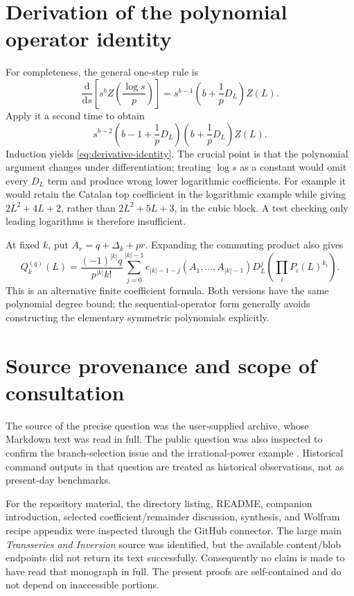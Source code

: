 \documentclass[11pt,a4paper]{article}
\theoremstyle{definition}
\theoremstyle{remark}
\newcommand{\dd}{\mathrm d}
\begin{document}
\section{Derivation of the polynomial operator identity}

For completeness, the general one-step rule is
\[
 \frac{\dd}{\dd s}\left[s^bZ\!\left(\frac{\log s}{p}\right)\right]
 =s^{b-1}\left(b+\frac1pD_L\right)Z(L).
\]
Apply it a second time to obtain
\[
 s^{b-2}\left(b-1+\frac1pD_L\right)
          \left(b+\frac1pD_L\right)Z(L).
\]
Induction yields \eqref{eq:derivative-identity}. The crucial point is that the
polynomial argument changes under differentiation; treating $\log s$ as a
constant would omit every $D_L$ term and produce wrong lower logarithmic
coefficients. For example it would retain the Catalan top coefficient in the
logarithmic example while giving $2L^2+4L+2$, rather than
$2L^2+5L+3$, in the cubic block. A test checking
only leading logarithms is therefore insufficient.

At fixed $k$, put $A_r=q+\Delta_k+pr$. Expanding the commuting product also
gives
\[
 Q_k^{(q)}(L)=\frac{(-1)^{|k|}q}{p^{|k|}k!}
 \sum_{j=0}^{|k|-1}e_{|k|-1-j}(A_1,\ldots,A_{|k|-1})
 D_L^j\!\left(\prod_iP_i(L)^{k_i}\right).
\]
This is an alternative finite coefficient formula. Both versions have the
same polynomial degree bound; the sequential-operator form generally avoids
constructing the elementary symmetric polynomials explicitly.

\section{Source provenance and scope of consultation}

The source of the precise question was the user-supplied archive, whose
Markdown text was read in full. The public question was also inspected to
confirm the branch-selection issue and the irrational-power example
\cite{question}. Historical command outputs in that question are treated as
historical observations, not as present-day benchmarks.

For the repository material, the directory listing, README, companion
introduction, selected coefficient/remainder discussion, synthesis, and Wolfram
recipe appendix were inspected through the GitHub connector. The large main
\emph{Transseries and Inversion} source was identified, but the available
content/blob endpoints did not return its text successfully. Consequently no
claim is made to have read that monograph in full. The present proofs are
self-contained and do not depend on inaccessible portions.
\end{document}
